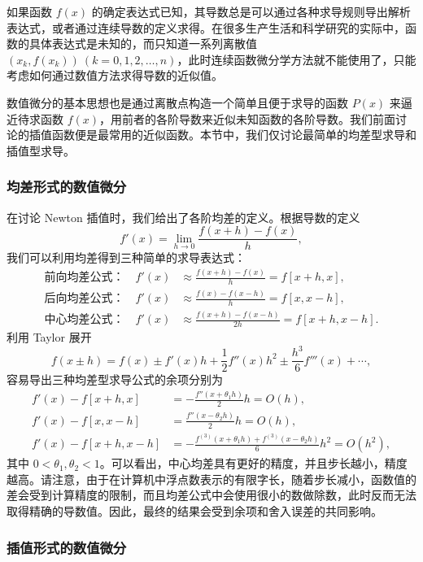 如果函数 $f(x)$ 的确定表达式已知，其导数总是可以通过各种求导规则导出解析表达式，或者通过连续导数的定义求得。在很多生产生活和科学研究的实际中，函数的具体表达式是未知的，而只知道一系列离散值 $(x_k,f(x_k))\ (k=0,1,2,\ldots,n)$，此时连续函数微分学方法就不能使用了，只能考虑如何通过数值方法求得导数的近似值。

数值微分的基本思想也是通过离散点构造一个简单且便于求导的函数 $P(x)$ 来逼近待求函数 $f(x)$，用前者的各阶导数来近似未知函数的各阶导数。我们前面讨论的插值函数便是最常用的近似函数。本节中，我们仅讨论最简单的均差型求导和插值型求导。

\subsubsection{均差形式的数值微分}

在讨论 Newton 插值时，我们给出了各阶均差的定义。根据导数的定义
\begin{equation}
f'(x)=\lim_{h\to0}\frac{f(x+h)-f(x)}{h},
\tag{2.1.28}
\end{equation}
我们可以利用均差得到三种简单的求导表达式：
\begin{align}
\text{前向均差公式：}\quad
f'(x)&\approx\frac{f(x+h)-f(x)}{h}=f[x+h,x],
\tag{2.1.29}\\
\text{后向均差公式：}\quad
f'(x)&\approx\frac{f(x)-f(x-h)}{h}=f[x,x-h],
\tag{2.1.30}\\
\text{中心均差公式：}\quad
f'(x)&\approx\frac{f(x+h)-f(x-h)}{2h}=f[x+h,x-h].
\tag{2.1.31}
\end{align}
利用 Taylor 展开
\begin{equation}
f(x\pm h)=f(x)\pm f'(x)h+\frac12f''(x)h^2\pm\frac{h^3}{6}f'''(x)+\cdots,
\tag{2.1.32}
\end{equation}
容易导出三种均差型求导公式的余项分别为
\begin{align}
f'(x)-f[x+h,x]&=-\frac{f''(x+\theta_1h)}{2}h=O(h),
\tag{2.1.33}\\
f'(x)-f[x,x-h]&=\frac{f''(x-\theta_2h)}{2}h=O(h),
\tag{2.1.34}\\
f'(x)-f[x+h,x-h]&=-\frac{f^{(3)}(x+\theta_1h)+f^{(3)}(x-\theta_2h)}{6}h^2=O(h^2),
\tag{2.1.35}
\end{align}
其中 $0<\theta_1,\theta_2<1$。可以看出，中心均差具有更好的精度，并且步长越小，精度越高。请注意，由于在计算机中浮点数表示的有限字长，随着步长减小，函数值的差会受到计算精度的限制，而且均差公式中会使用很小的数做除数，此时反而无法取得精确的导数值。因此，最终的结果会受到余项和舍入误差的共同影响。

\subsubsection{插值形式的数值微分}

